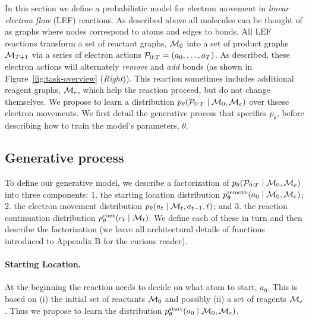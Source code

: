 


In this section we define a probabilistic model for electron movement in \emph{linear electron flow} (LEF) reactions.
As described above all molecules can be thought of as graphs where nodes correspond to atoms and edges to bonds. All LEF reactions transform a set of reactant graphs, ${\mathcal{M}}_0$ into a set of product graphs ${\mathcal{M}}_{T+1}$ via a series of electron actions ${\mathcal{P}}_{0:T} = (a_0, \dots, a_{T})$.  As described, these electron actions will alternately \emph{remove} and \emph{add} bonds (as shown in Figure~\ref{fig:task-overview} (\emph{Right})). This reaction sometimes includes additional reagent graphs, ${\mathcal{M}}_e$, which help the reaction proceed, but do not change themselves.
We propose to learn a distribution $p_\theta( {\mathcal{P}}_{0:T} \mid {\mathcal{M}}_0, {\mathcal{M}}_e)$ over thsese electron movements. 
We first detail the generative process %
that specifies $p_\theta$, before describing how to train the model's parameters, $\theta$.


\subsection{Generative process}


To define our generative model, we describe a factorization of $p_\theta( {\mathcal{P}}_{0:T} \mid {\mathcal{M}}_0, {\mathcal{M}}_e)$ into three components: 1. the starting location distribution $p^\textrm{remove}_\theta(a_0 \mid {\mathcal{M}}_0, {\mathcal{M}}_e)$; 2. the electron movement distribution $p_\theta(a_t \mid {\mathcal{M}}_{t}, a_{t-1}, t)$; and 3.  the reaction continuation distribution $p^\textrm{cont}_\theta(c_{t} \mid {\mathcal{M}}_{t})$. We define each of these in turn and then describe the factorization (we leave all architectural details of functions introduced to Appendix B for the curious reader).

\paragraph{Starting Location.}
At the beginning the reaction needs to decide on what atom to start, $a_0$. This is based on (i) the initial set of reactants ${\mathcal{M}}_0$ and possibly (ii) a set of reagents ${\mathcal{M}}_e$. Thus we propose to learn the distribution $p_\theta^{\mathrm{start}}(a_0 \mid {\mathcal{M}}_0, {\mathcal{M}}_e)$.

